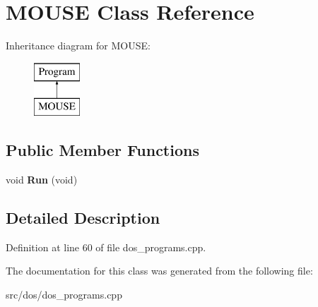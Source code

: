 \hypertarget{classMOUSE}{\section{M\-O\-U\-S\-E Class Reference}
\label{classMOUSE}
}
Inheritance diagram for M\-O\-U\-S\-E\-:\begin{figure}[H]
\begin{center}
\leavevmode
\includegraphics[height=2.000000cm]{classMOUSE}
\end{center}
\end{figure}
\subsection*{Public Member Functions}
\begin{DoxyCompactItemize}
\item 
\hypertarget{classMOUSE_a534674c1b95232e1fa0a0ec93bcbd698}{void {\bfseries Run} (void)}\label{classMOUSE_a534674c1b95232e1fa0a0ec93bcbd698}

\end{DoxyCompactItemize}


\subsection{Detailed Description}


Definition at line 60 of file dos\-\_\-programs.\-cpp.



The documentation for this class was generated from the following file\-:\begin{DoxyCompactItemize}
\item 
src/dos/dos\-\_\-programs.\-cpp\end{DoxyCompactItemize}
